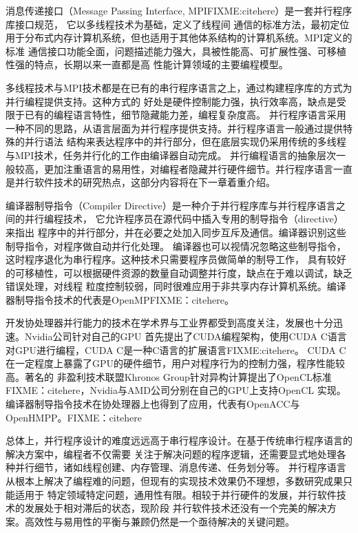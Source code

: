 消息传递接口（Message Passing Interface, MPIFIXME:citehere）是一套并行程序库接口规范，
它以多线程技术为基础，定义了线程间
通信的标准方法，最初定位用于分布式内存计算机系统，但也适用于其他体系结构的计算机系统。MPI定义的标准
通信接口功能全面，问题描述能力强大，具被性能高、可扩展性强、可移植性强的特点，长期以来一直都是高
性能计算领域的主要编程模型。

多线程技术与MPI技术都是在已有的串行程序语言之上，通过构建程序库的方式为并行编程提供支持。这种方式的
好处是硬件控制能力强，执行效率高，缺点是受限于已有的编程语言特性，细节隐藏能力差，编程复杂度高。
并行程序语言采用一种不同的思路，从语言层面为并行程序提供支持。并行程序语言一般通过提供特殊的并行语法
结构来表达程序中的并行部分，但在底层实现仍采用传统的多线程与MPI技术，任务并行化的工作由编译器自动完成。
并行编程语言的抽象层次一般较高，更加注重语言的易用性，对编程者隐藏并行硬件细节。并行程序语言一直
是并行软件技术的研究热点，这部分内容将在下一章着重介绍。

编译器制导指令（Compiler Directive）是一种介于并行程序库与并行程序语言之间的并行编程技术，
它允许程序员在源代码中插入专用的制导指令（directive）来指出
程序中的并行部分，并在必要之处加入同步互斥及通信。编译器识别这些制导指令，对程序做自动并行化处理。
编译器也可以视情况忽略这些制导指令，这时程序退化为串行程序。这种技术只需要程序员做简单的制导工作，
具有较好的可移植性，可以根据硬件资源的数量自动调整并行度，缺点在于难以调试，缺乏错误处理，对线程
粒度控制较弱，同时很难应用于非共享内存计算机系统。编译器制导指令技术的代表是OpenMPFIXME：citehere。

开发协处理器并行能力的技术在学术界与工业界都受到高度关注，发展也十分迅速。Nvidia公司针对自己的GPU
首先提出了CUDA编程架构，使用CUDA C语言对GPU进行编程，CUDA C是一种C语言的扩展语言FIXME:citehere。
CUDA C在一定程度上暴露了GPU的硬件细节，用户对程序行为的控制力强，程序性能较高。著名的
非盈利技术联盟Khronos Group针对异构计算提出了OpenCL标准FIXME：citehere，Nvidia与AMD公司分别在自己的GPU上支持OpenCL
实现。编译器制导指令技术在协处理器上也得到了应用，代表有OpenACC与OpenHMPP。FIXME：citehere

总体上，并行程序设计的难度远远高于串行程序设计。在基于传统串行程序语言的解决方案中，编程者不仅需要
关注于解决问题的程序逻辑，还需要显式地处理各种并行细节，诸如线程创建、内存管理、消息传递、任务划分等。
并行程序语言从根本上解决了编程难的问题，但现有的实现技术效果仍不理想，多数研究成果只能适用于
特定领域特定问题，通用性有限。相较于并行硬件的发展，并行软件技术的发展处于相对滞后的状态，现阶段
并行软件技术还没有一个完美的解决方案。高效性与易用性的平衡与兼顾仍然是一个亟待解决的关键问题。


